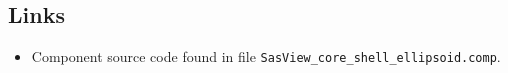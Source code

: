 \subsection*{Links}
\begin{itemize}
  \item Component source code found in file \texttt{SasView\_core\_shell\_ellipsoid.comp}.
\end{itemize}
